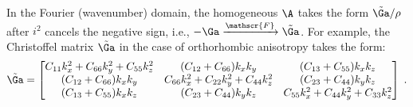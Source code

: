 In the Fourier (wavenumber) domain, the homogeneous $\A$ takes the form $\tilde{\Ga}/\rho$ after $i^2$ cancels the negative sign, i.e., $-\Ga \xrightarrow{\mathscr{F}} \tilde{\Ga}$. 
For example, the Christoffel matrix $\tilde{\Ga}$ in the case of orthorhombic anisotropy takes the form:
\begin{equation}
  \label{eq:chris}
  \tilde{\Ga} = 
  \begin{bmatrix}
    C_{11}k_x^2+C_{66}k_y^2+C_{55}k_z^2 & (C_{12}+C_{66})k_xk_y & (C_{13}+C_{55})k_xk_z \\
    (C_{12}+C_{66})k_xk_y & C_{66}k_x^2+C_{22}k_y^2+C_{44}k_z^2 & (C_{23}+C_{44})k_yk_z  \\
    (C_{13}+C_{55})k_xk_z & (C_{23}+C_{44})k_yk_z & C_{55}k_x^2+C_{44}k_y^2+C_{33}k_z^2
  \end{bmatrix} \;.
\end{equation}

